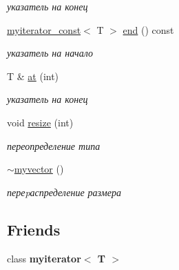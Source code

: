 \begin{DoxyCompactItemize}
\begin{DoxyCompactList}\small\item\em указатель на конец \end{DoxyCompactList}\item 
\hypertarget{classmyvector_ab8e1faa7b059272129439fdbf58ac6dc}{}\hyperlink{classmyiterator__const}{myiterator\+\_\+const}$<$ T $>$ \hyperlink{classmyvector_ab8e1faa7b059272129439fdbf58ac6dc}{end} () const \label{classmyvector_ab8e1faa7b059272129439fdbf58ac6dc}

\begin{DoxyCompactList}\small\item\em указатель на начало \end{DoxyCompactList}\item 
\hypertarget{classmyvector_a94425d51ce69dc5ab259d4981b838a08}{}T \& \hyperlink{classmyvector_a94425d51ce69dc5ab259d4981b838a08}{at} (int)\label{classmyvector_a94425d51ce69dc5ab259d4981b838a08}

\begin{DoxyCompactList}\small\item\em указатель на конец \end{DoxyCompactList}\item 
\hypertarget{classmyvector_ab7d711e8ac74332608feaa3c464f9f81}{}void \hyperlink{classmyvector_ab7d711e8ac74332608feaa3c464f9f81}{resize} (int)\label{classmyvector_ab7d711e8ac74332608feaa3c464f9f81}

\begin{DoxyCompactList}\small\item\em переопределение типа \end{DoxyCompactList}\item 
\hypertarget{classmyvector_a1e567b7e4cd690f419e904f11a7cade9}{}\hyperlink{classmyvector_a1e567b7e4cd690f419e904f11a7cade9}{$\sim$myvector} ()\label{classmyvector_a1e567b7e4cd690f419e904f11a7cade9}

\begin{DoxyCompactList}\small\item\em переpаспределение размера \end{DoxyCompactList}\end{DoxyCompactItemize}
\subsection*{Friends}
\begin{DoxyCompactItemize}
\item 
\hypertarget{classmyvector_a4dd08b780298d20397ed5134eca3dda5}{}class {\bfseries myiterator$<$ T $>$}\label{classmyvector_a4dd08b780298d20397ed5134eca3dda5}

\end{DoxyCompactItemize}


